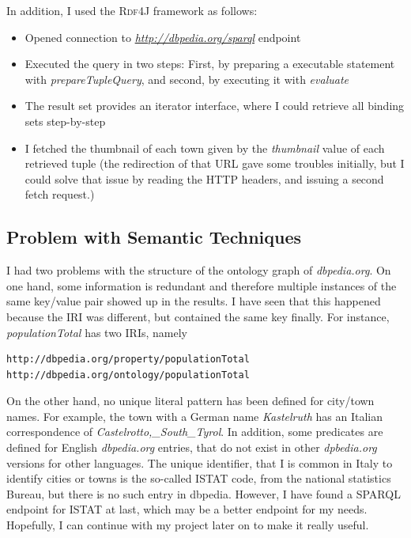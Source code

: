 In addition, I used the \textsc{Rdf4J} framework as follows:
\begin{itemize}
\item Opened connection to \textit{\url{http://dbpedia.org/sparql}} endpoint
\item Executed the query in two steps: First, by preparing a executable statement with \textit{prepareTupleQuery}, and second, by executing it with \textit{evaluate}
\item The result set provides an iterator interface, where I could retrieve all binding sets step-by-step
\item I fetched the thumbnail of each town given by the \textit{thumbnail} value of each retrieved tuple (the redirection of that URL gave some troubles initially, but I could solve that issue by reading the HTTP headers, and issuing a second fetch request.)
\end{itemize}

\subsection{Problem with Semantic Techniques}
I had two problems with the structure of the ontology graph of \textit{dbpedia.org}. On one hand, some information is redundant and therefore multiple instances of the same key/value pair showed up in the results. I have seen that this happened because the IRI was different, but contained the same key finally. For instance, \textit{populationTotal} has two IRIs, namely
\begin{lstlisting}
http://dbpedia.org/property/populationTotal
http://dbpedia.org/ontology/populationTotal
\end{lstlisting}

On the other hand, no unique literal pattern has been defined for city/town names. For example, the town with a German name \textit{Kastelruth} has an Italian correspondence of \textit{Castelrotto,\_South\_Tyrol}. In addition, some predicates are defined for English \textit{dbpedia.org} entries, that do not exist in other \textit{dpbedia.org} versions for other languages. The unique identifier, that I is common in Italy to identify cities or towns is the so-called ISTAT code, from the national statistics Bureau, but there is no such entry in dbpedia. However, I have found a SPARQL endpoint for ISTAT at last, which may be a better endpoint for my needs. Hopefully, I can continue with my project later on to make it really useful.